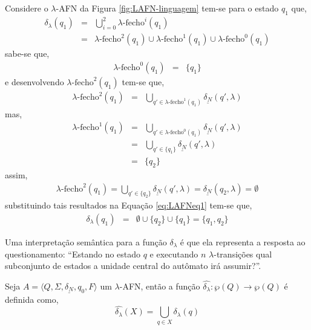 \begin{exemplo}
	Considere o $\lambda$-AFN da Figura \ref{fig:LAFN-linguagem} tem-se para o estado $q_1$ que,
	\begin{eqnarray}\label{eq:LAFNeq1}
		\delta_\lambda(q_1) & = & \bigcup_{i = 0}^{2}\lambda\text{-fecho}^i(q_1) \nonumber\\
		& = & \lambda\text{-fecho}^2(q_1) \cup \lambda\text{-fecho}^1(q_1) \cup \lambda\text{-fecho}^0(q_1)  
	\end{eqnarray}
	sabe-se que, 
	\begin{eqnarray*}
		\lambda\text{-fecho}^{0}(q_1) & = &  \{q_1\}
	\end{eqnarray*}
	e desenvolvendo $\lambda\text{-fecho}^{2}(q_1)$ tem-se que,
	\begin{eqnarray*}
		\lambda\text{-fecho}^{2}(q_1) & = &  \bigcup_{q' \in \lambda\text{-fecho}^{1}(q_1)} \underline{\delta_N}(q', \lambda)
	\end{eqnarray*}
	mas, 
	\begin{eqnarray*}
		\lambda\text{-fecho}^{1}(q_1) & = & \bigcup_{q' \in \lambda\text{-fecho}^{0}(q_1)} \underline{\delta_N}(q', \lambda)\\
		& = & \bigcup_{q' \in \{q_1\}} \underline{\delta_N}(q', \lambda)\\
		& = & \{q_2\}
	\end{eqnarray*}
	assim,
	\begin{eqnarray*}
		\lambda\text{-fecho}^{2}(q_1)  =   \bigcup_{q' \in \{q_2\}} \underline{\delta_N}(q', \lambda) = \underline{\delta_N}(q_2, \lambda) = \emptyset 
	\end{eqnarray*}
	substituindo tais resultados na Equação \ref{eq:LAFNeq1} tem-se que, 
	\begin{eqnarray*}\label{eq:LAFNeq2}
		\delta_\lambda(q_1) & = &  \emptyset \cup \{q_2\} \cup \{q_1\} = \{q_1, q_2\}
	\end{eqnarray*}
\end{exemplo}

Uma interpretação semântica para a função $\delta_\lambda$ é que ela representa a resposta ao questionamento: ``Estando no estado $q$ e executando $n$ $\lambda$-transições qual subconjunto de estados a unidade central do autômato irá assumir?''. 

\begin{definicao}\label{def:L-Fecho}
	Seja $A = \langle Q, \Sigma, \underline{\delta_N}, q_0, F\rangle$ um $\lambda$-AFN, então a função $\widehat{\delta_\lambda}: \wp(Q) \rightarrow \wp(Q)$ é definida como,
	\begin{equation}
		\widehat{\delta_\lambda}(X) = \bigcup_{q \in X} \delta_\lambda(q)
	\end{equation}
\end{definicao}

